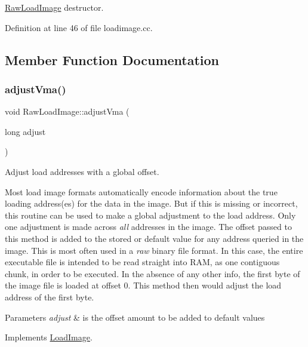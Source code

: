 \mbox{\hyperlink{class_raw_load_image}{Raw\+Load\+Image}} destructor. 



Definition at line 46 of file loadimage.\+cc.



\subsection{Member Function Documentation}
\mbox{\label{class_raw_load_image_aee25cd14ca80ad47db0b17d56cc31180}} 
\subsubsection{\texorpdfstring{adjustVma()}{adjustVma()}}
{\footnotesize\ttfamily void Raw\+Load\+Image\+::adjust\+Vma (\begin{DoxyParamCaption}\item[{long}]{adjust }\end{DoxyParamCaption})\hspace{0.3cm}{\ttfamily [virtual]}}



Adjust load addresses with a global offset. 

Most load image formats automatically encode information about the true loading address(es) for the data in the image. But if this is missing or incorrect, this routine can be used to make a global adjustment to the load address. Only one adjustment is made across {\itshape all} addresses in the image. The offset passed to this method is added to the stored or default value for any address queried in the image. This is most often used in a {\itshape raw} binary file format. In this case, the entire executable file is intended to be read straight into R\+AM, as one contiguous chunk, in order to be executed. In the absence of any other info, the first byte of the image file is loaded at offset 0. This method then would adjust the load address of the first byte. 
\begin{DoxyParams}{Parameters}
{\em adjust} & is the offset amount to be added to default values \\
\hline
\end{DoxyParams}


Implements \mbox{\hyperlink{class_load_image_a51a254f705fba6f0e6524995acd5aaa7}{Load\+Image}}.




